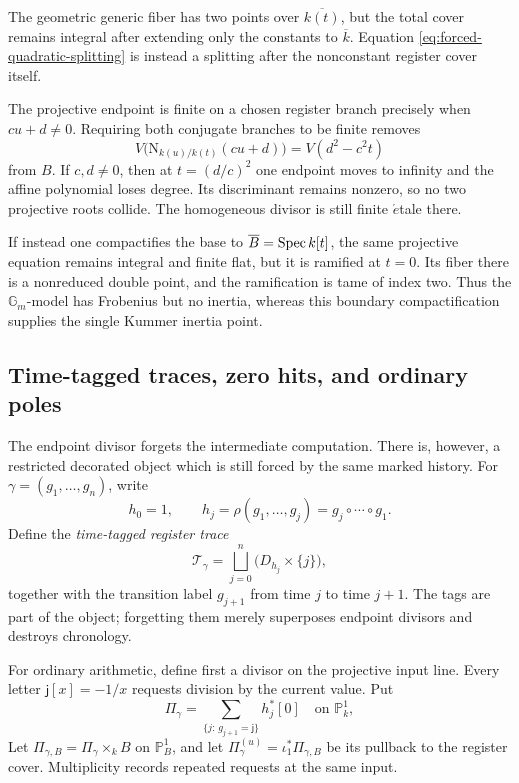The geometric generic fiber has two points over
\(\overline{k(t)}\), but the total cover remains integral after extending only
the constants to \(\overline k\).  Equation
\eqref{eq:forced-quadratic-splitting} is instead a splitting after the
nonconstant register cover itself.

\begin{remark}
\label{rem:quadratic-affine-pole}
The projective endpoint is finite on a chosen register branch precisely when
\(cu+d\ne0\).  Requiring both conjugate branches to be finite removes
\[
 V\bigl(\mathrm N_{k(u)/k(t)}(cu+d)\bigr)
 =V(d^2-c^2t)
\]
from \(B\).  If \(c,d\ne0\), then at \(t=(d/c)^2\) one endpoint moves to
infinity and the affine polynomial loses degree.  Its discriminant remains
nonzero, so no two projective roots collide.  The homogeneous divisor is still
finite \(\acute{e}\)tale there.

If instead one compactifies the base to \(\overline B=\operatorname{Spec} k[t]\), the same
projective equation remains integral and finite flat, but it is ramified at
\(t=0\).  Its fiber there is a nonreduced double point, and the ramification is
tame of index two.  Thus the \(\mathbb G_m\)-model has Frobenius but no inertia,
whereas this boundary compactification supplies the single Kummer inertia point.
\end{remark}

\subsection{Time-tagged traces, zero hits, and ordinary poles}
\label{subsec:tagged-history-trace}

The endpoint divisor forgets the intermediate computation.  There is, however,
a restricted decorated object which is still forced by the same marked history.
For
\(\gamma=(g_1,\ldots,g_n)\), write
\[
 h_0=1,
 \qquad
 h_j=\rho(g_1,\ldots,g_j)
      =g_j\circ\cdots\circ g_1.
\]
Define the \emph{time-tagged register trace}
\begin{equation}
 \mathcal T_\gamma
 =\bigsqcup_{j=0}^n
   \bigl(D_{h_j}\times\{j\}\bigr),
 \label{eq:time-tagged-register-trace}
\end{equation}
together with the transition label \(g_{j+1}\) from time \(j\) to time
\(j+1\).  The tags are part of the object; forgetting them merely superposes
endpoint divisors and destroys chronology.

For ordinary arithmetic, define first a divisor on the projective input line.
Every letter \(\mathsf j[x]=-1/x\) requests division by the current value.  Put
\begin{equation}
 \Pi_\gamma
 =\sum_{\{j:\,g_{j+1}=\mathsf j\}} h_j^*[0]
 \quad\text{on }\mathbb P^1_k,
 \label{eq:universal-history-pole-divisor}
\end{equation}
Let \(\Pi_{\gamma,B}=\Pi_\gamma\times_k B\) on \(\mathbb P^1_B\), and let
\(\Pi_\gamma^{(u)}=\iota_1^*\Pi_{\gamma,B}\) be its pullback to the register
cover.  Multiplicity records repeated requests at the same input.

